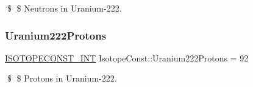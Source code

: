 \$ \$ Neutrons in Uranium-\/222. \mbox{\label{group___isotope_const-_uranium-_u222_ga0096975d09814f8ec4f97374652c1969}} 
\subsubsection{\texorpdfstring{Uranium222\+Protons}{Uranium222Protons}}
{\footnotesize\ttfamily \mbox{\hyperlink{group___isotope_const-_macros_ga5f18360b3e99483a35c32d789e62621c}{I\+S\+O\+T\+O\+P\+E\+C\+O\+N\+S\+T\+\_\+\+I\+NT}} Isotope\+Const\+::\+Uranium222\+Protons = 92}

\$ \$ Protons in Uranium-\/222. 